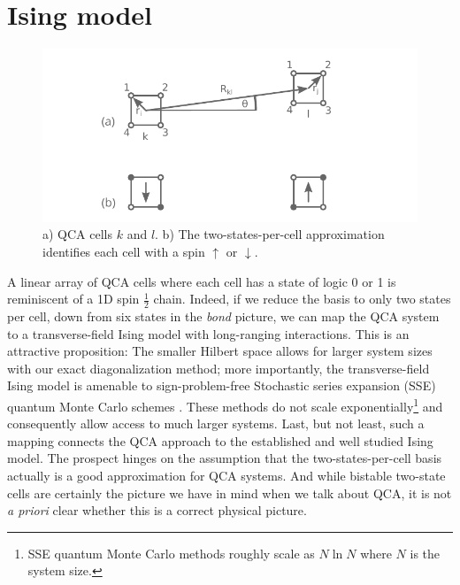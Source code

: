 \section{Ising model}

\newcommand{\ket}[1]{\left|#1\right>}
\newcommand{\bra}[1]{\left<#1\right|}

%
\begin{figure}
  \center
  \includegraphics{ising}
  \caption{a) QCA cells $k$ and $l$. b) The two-states-per-cell approximation
  identifies each cell with a spin $\uparrow$ or $\downarrow$.}
  \label{fig:cells2}
\end{figure}
%
A linear array of QCA cells where each cell has a state of logic 0 or 1 is
reminiscent of a 1D spin $\frac{1}{2}$ chain. Indeed, if we reduce the basis to
only two states per cell, down from six states in the \emph{bond} picture, we
can map the QCA system to a transverse-field Ising model with long-ranging
interactions. This is an attractive proposition: The smaller Hilbert space
allows for larger system sizes with our exact diagonalization method; more
importantly, the transverse-field Ising model is amenable to sign-problem-free
Stochastic series expansion (SSE) quantum Monte Carlo schemes
\cite{Sandvik2003}. These methods do not scale exponentially\footnote{SSE
quantum Monte Carlo methods roughly scale as $N \ln N$ where $N$ is the system
size.} and consequently allow access to much larger systems. Last, but not
least, such a mapping connects the QCA approach to the established and well
studied Ising model. The prospect hinges on the assumption that the
two-states-per-cell basis actually is a good approximation for QCA systems. And
while bistable two-state cells are certainly the picture we have in mind when we
talk about QCA, it is not \emph{a priori} clear whether this is a correct
physical picture. 

